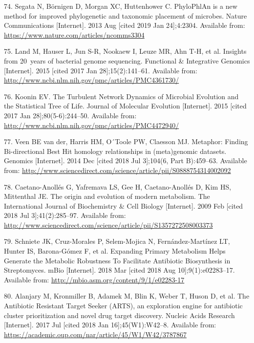 \documentclass[12pt,twoside]{reedthesis}
\begin{document}
  \hypertarget{ref-segata_phylophlan_2013}{}
  74. Segata N, Börnigen D, Morgan XC, Huttenhower C. PhyloPhlAn is a new
  method for improved phylogenetic and taxonomic placement of microbes.
  Nature Communications {[}Internet{]}. 2013 Aug {[}cited 2019 Jan
  24{]};4:2304. Available from:
  \url{https://www.nature.com/articles/ncomms3304}
  
  \hypertarget{ref-land_insights_2015}{}
  75. Land M, Hauser L, Jun S-R, Nookaew I, Leuze MR, Ahn T-H, et al.
  Insights from 20~years of bacterial genome sequencing. Functional \&
  Integrative Genomics {[}Internet{]}. 2015 {[}cited 2017 Jan
  28{]};15(2):141--61. Available from:
  \url{http://www.ncbi.nlm.nih.gov/pmc/articles/PMC4361730/}
  
  \hypertarget{ref-koonin_turbulent_2015}{}
  76. Koonin EV. The Turbulent Network Dynamics of Microbial Evolution and
  the Statistical Tree of Life. Journal of Molecular Evolution
  {[}Internet{]}. 2015 {[}cited 2017 Jan 28{]};80(5-6):244--50. Available
  from: \url{http://www.ncbi.nlm.nih.gov/pmc/articles/PMC4472940/}
  
  \hypertarget{ref-van_der_veen_metaphor_2014}{}
  77. Veen BE van der, Harris HM, O´Toole PW, Claesson MJ. Metaphor:
  Finding Bi-directional Best Hit homology relationships in (meta)genomic
  datasets. Genomics {[}Internet{]}. 2014 Dec {[}cited 2018 Jul
  3{]};104(6, Part B):459--63. Available from:
  \url{http://www.sciencedirect.com/science/article/pii/S0888754314002092}
  
  \hypertarget{ref-caetano-anolles_origin_metabolism_2009}{}
  78. Caetano-Anollés G, Yafremava LS, Gee H, Caetano-Anollés D, Kim HS,
  Mittenthal JE. The origin and evolution of modern metabolism. The
  International Journal of Biochemistry \& Cell Biology {[}Internet{]}.
  2009 Feb {[}cited 2018 Jul 3{]};41(2):285--97. Available from:
  \url{http://www.sciencedirect.com/science/article/pii/S1357272508003373}
  
  \hypertarget{ref-schniete_expanding_2018}{}
  79. Schniete JK, Cruz-Morales P, Selem-Mojica N, Fernández-Martínez LT,
  Hunter IS, Barona-Gómez F, et al. Expanding Primary Metabolism Helps
  Generate the Metabolic Robustness To Facilitate Antibiotic Biosynthesis
  in Streptomyces. mBio {[}Internet{]}. 2018 Mar {[}cited 2018 Aug
  10{]};9(1):e02283--17. Available from:
  \url{http://mbio.asm.org/content/9/1/e02283-17}
  
  \hypertarget{ref-alanjary_antibiotic_2017}{}
  80. Alanjary M, Kronmiller B, Adamek M, Blin K, Weber T, Huson D, et al.
  The Antibiotic Resistant Target Seeker (ARTS), an exploration engine for
  antibiotic cluster prioritization and novel drug target discovery.
  Nucleic Acids Research {[}Internet{]}. 2017 Jul {[}cited 2018 Jan
  16{]};45(W1):W42--8. Available from:
  \url{https://academic.oup.com/nar/article/45/W1/W42/3787867}
  
\end{document}

